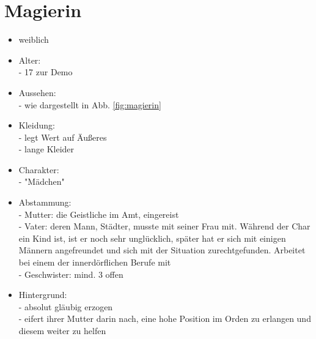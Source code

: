 \section{Magierin}
\begin{itemize}
	\item weiblich
	\item Alter:\\
	- 17 zur Demo
	\item Aussehen:\\
	- wie dargestellt in Abb. \ref{fig:magierin}
	\item Kleidung:\\
	- legt Wert auf Äußeres\\
	- lange Kleider
	\item Charakter:\\
	- "Mädchen"
	\item Abstammung:\\
	- Mutter: die Geistliche im Amt, eingereist\\
	- Vater: deren Mann, Städter, musste mit seiner Frau mit. Während der Char ein Kind ist, ist er noch sehr unglücklich, später hat er sich mit einigen Männern angefreundet und sich mit der Situation zurechtgefunden. Arbeitet bei einem der innerdörflichen Berufe mit\\
	- Geschwister: mind. 3 offen
	\item Hintergrund:\\
	- absolut gläubig erzogen\\
	- eifert ihrer Mutter darin nach, eine hohe Position im Orden zu erlangen und diesem weiter zu helfen
\end{itemize}

